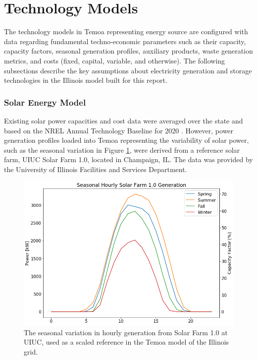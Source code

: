 \appendix                     
\section{Technology Models}\label{sec:appendix}
The technology models in Temoa representing energy source are configured with 
data regarding fundamental techno-economic parameters such as their capacity, 
capacity factors, seasonal generation profiles, auxiliary products, waste 
generation metrics, and costs (fixed, capital, variable, and otherwise). 
The following subsections describe the key assumptions about electricity 
generation and storage technologies in the Illinois model built for this 
report.

\subsubsection{Solar Energy Model}
Existing solar power capacities and cost data were averaged over the state and 
based on the \gls{NREL} Annual Technology Baseline for 2020 
\cite{nrel_2020_2020}. However, power 
generation profiles loaded into Temoa representing the variability of solar 
power, such as the seasonal variation in Figure 
\ref{fig:seasonal_hourly_solar}, were derived from a reference solar farm, 
\gls{UIUC} Solar Farm 1.0, located in Champaign, IL. The data was provided by the University of Illinois Facilities and Services Department.
\FloatBarrier

\begin{figure}[H]
	\centering
	\includegraphics[width=0.7\columnwidth]{./img/seasonal_hourly_solar.png}
	\caption{}
	\caption{The seasonal variation in hourly generation from Solar Farm 
        1.0 at \gls{UIUC}, used as a scaled reference in the Temoa model of the Illinois grid. }
	\label{fig:seasonal_hourly_solar}
\end{figure}

\FloatBarrier

